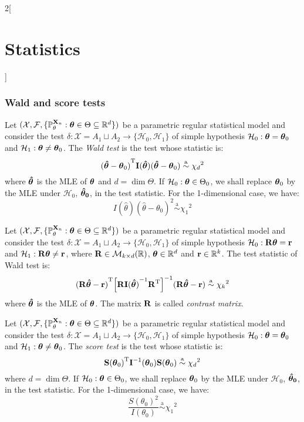 \documentclass[../../../main_math.tex]{subfiles}
\begin{document}
\begin{multicols}{2}[\section{Statistics}]
  \subsubsection{Wald and score tests}
  \begin{definition}
    Let $(\mathcal{X},\mathcal{F},\{\mathbb{P}_\theta^{\boldsymbol{\mathrm{X}}_n}:\boldsymbol{\mathrm{\theta}}\in\Theta\subseteq\mathbb{R}^d\})$ be a parametric regular statistical model and consider the test $\delta:\mathcal{X}=A_1\sqcup A_2\rightarrow\{\mathcal{H}_0,\mathcal{H}_1\}$ of simple hypothesis $\mathcal{H}_0:\boldsymbol{\mathrm{\theta}}=\boldsymbol{\mathrm{\theta}}_0$ and $\mathcal{H}_1:\boldsymbol{\mathrm{\theta}}\ne\boldsymbol{\mathrm{\theta}}_0$. The \emph{Wald test} is the test whose statistic is: $${(\boldsymbol{\mathrm{\hat\theta}}-\boldsymbol{\mathrm{\theta}}_0)}^{\mathrm{T}}\boldsymbol{\mathrm{I}}(\boldsymbol{\mathrm{\hat\theta}})(\boldsymbol{\mathrm{\hat\theta}}-\boldsymbol{\mathrm{\theta}}_0)\overset{\text{a}}{\sim}{\chi_d}^2$$ where $\boldsymbol{\mathrm{\hat\theta}}$ is the MLE of $\boldsymbol{\mathrm{\theta}}$ and $d=\dim\Theta$. If $\mathcal{H}_0:\boldsymbol{\mathrm{\theta}}\in\Theta_0$, we shall replace $\boldsymbol{\mathrm{\theta}}_0$ by the MLE under $\mathcal{H}_0$, $\boldsymbol{\mathrm{\hat\theta_0}}$, in the test statistic. For the 1-dimensional case, we have: $$I(\hat\theta){(\hat\theta-\theta_0)}^2\overset{\text{a}}{\sim}{\chi_1}^2$$
  \end{definition}
  \begin{corollary}
    Let $(\mathcal{X},\mathcal{F},\{\mathbb{P}_\theta^{\boldsymbol{\mathrm{X}}_n}:\boldsymbol{\mathrm{\theta}}\in\Theta\subseteq\mathbb{R}^d\})$ be a parametric regular statistical model and consider the test $\delta:\mathcal{X}=A_1\sqcup A_2\rightarrow\{\mathcal{H}_0,\mathcal{H}_1\}$ of simple hypothesis $\mathcal{H}_0:\boldsymbol{\mathrm{R}}\boldsymbol{\mathrm{\theta}}=\boldsymbol{\mathrm{r}}$ and $\mathcal{H}_1:\boldsymbol{\mathrm{R}}\boldsymbol{\mathrm{\theta}}\ne\boldsymbol{\mathrm{r}}$, where $\boldsymbol{\mathrm{R}}\in\mathcal{M}_{k\times d}(\mathbb{R})$, $\boldsymbol{\mathrm{\theta}}\in\mathbb{R}^d$ and $\boldsymbol{\mathrm{r}}\in\mathbb{R}^k$. The test statistic of Wald test is: $${(\boldsymbol{\mathrm{R\hat\theta}}-\boldsymbol{\mathrm{r}})}^{\mathrm{T}}{\left[\boldsymbol{\mathrm{R}}{\boldsymbol{\mathrm{I}}(\boldsymbol{\mathrm{\hat\theta}})}^{-1}{\boldsymbol{\mathrm{R}}}^{\mathrm{T}}\right]}^{-1}(\boldsymbol{\mathrm{R\hat\theta}}-\boldsymbol{\mathrm{r}})\overset{\text{a}}{\sim}{\chi_k}^2$$ where $\boldsymbol{\mathrm{\hat\theta}}$ is the MLE of $\boldsymbol{\mathrm{\theta}}$. The matrix $\boldsymbol{\mathrm{R}}$ is called \emph{contrast matrix}.
  \end{corollary}
  \begin{definition}
    Let $(\mathcal{X},\mathcal{F},\{\mathbb{P}_\theta^{\boldsymbol{\mathrm{X}}_n}:\boldsymbol{\mathrm{\theta}}\in\Theta\subseteq\mathbb{R}^d\})$ be a parametric regular statistical model and consider the test $\delta:\mathcal{X}=A_1\sqcup A_2\rightarrow\{\mathcal{H}_0,\mathcal{H}_1\}$ of simple hypothesis $\mathcal{H}_0:\boldsymbol{\mathrm{\theta}}=\boldsymbol{\mathrm{\theta}}_0$ and $\mathcal{H}_1:\boldsymbol{\mathrm{\theta}}\ne\boldsymbol{\mathrm{\theta}}_0$. The \emph{score test} is the test whose statistic is: $${\boldsymbol{\mathrm{S}}(\boldsymbol{\mathrm{\theta}}_0)}^{\mathrm{T}}\boldsymbol{\mathrm{I}}^{-1}(\boldsymbol{\mathrm{\theta}}_0)\boldsymbol{\mathrm{S}}(\boldsymbol{\mathrm{\theta}}_0)\overset{\text{a}}{\sim}{\chi_d}^2$$ where $d=\dim\Theta$. If $\mathcal{H}_0:\boldsymbol{\mathrm{\theta}}\in\Theta_0$, we shall replace $\boldsymbol{\mathrm{\theta}}_0$ by the MLE under $\mathcal{H}_0$, $\boldsymbol{\mathrm{\hat\theta_0}}$, in the test statistic. For the 1-dimensional case, we have: $$\frac{{S(\theta_0)}^2}{I(\theta_0)}\overset{\text{a}}{\sim}{\chi_1}^2$$
  \end{definition}

\end{multicols}
\end{document}
